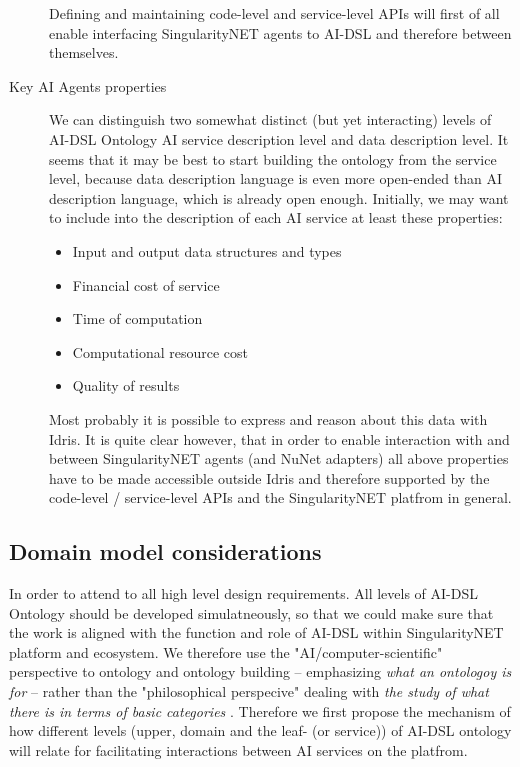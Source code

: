 \documentclass[]{report}
\begin{document}
\begin{description}
  Defining and maintaining code-level and service-level APIs will first of all
  enable interfacing SingularityNET agents to AI-DSL and therefore between
  themselves.

  \item[Key AI Agents properties] We can distinguish two somewhat distinct (but
  yet interacting) levels of AI-DSL Ontology AI service description level and
  data description level. It seems that it may be best to start building the
  ontology from the service level, because data description language is even
  more open-ended than AI description language, which is already open enough.
  Initially, we may want to include into the description of each AI service at
  least these properties: \begin{itemize} \item Input and output data structures
  and types \item Financial cost of service \item Time of computation \item
  Computational resource cost \item Quality of results \end{itemize} Most
  probably it is possible to express and reason about this data with Idris. It
  is quite clear however, that in order to enable interaction with and between
  SingularityNET agents (and NuNet adapters) all above properties have to be
  made accessible outside Idris and therefore supported by the code-level /
  service-level APIs and the SingularityNET platfrom in general.

\end{description}

\subsection{Domain model considerations}

In order to attend to all high level design requirements. All levels of AI-DSL
Ontology should be developed simulatneously, so that we could make sure that the
work is aligned with the function and role of AI-DSL within SingularityNET
platform and ecosystem. We therefore use the "AI/computer-scientific"
perspective to ontology and ontology building -- emphasizing \textit{what an
ontologoy is for} -- rather than the "philosophical perspecive" dealing with
\textit{the study of what there is in terms of basic categories}
\cite{gruber_translation_1993,sep-logic-ontology}. Therefore we first propose
the  mechanism of how different levels (upper, domain and the leaf- (or
service)) of AI-DSL ontology will relate for facilitating interactions between
AI services on the platfrom.
\end{document}
